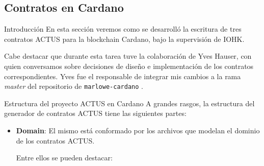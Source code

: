 \documentclass{beamer}
\begin{document}
\subsection{Contratos en Cardano}

\begin{frame}{Introducción}
En esta sección veremos como se desarrolló la escritura de tres contratos ACTUS para la blockchain Cardano, bajo la supervisión de IOHK.\@

\vfill

Cabe destacar que durante esta tarea tuve la colaboración de Yves Hauser, con quien conversamos sobre decisiones de diseño e implementación de los contratos correspondientes. Yves fue el responsable de integrar mis cambios a la rama \textit{master} del repositorio de \texttt{marlowe-cardano} \cite{marlowe-cardano-github}. %


\end{frame}

\begin{frame}[fragile]{Estructura del proyecto ACTUS en Cardano}
A grandes rasgos, la estructura del generador de contratos ACTUS tiene las siguientes partes:
    \vfill
    
\begin{itemize}
    \item  \textbf{Domain}: El mismo está conformado por los archivos que modelan el dominio de los contratos ACTUS.
        \medskip

        \pause Entre ellos se pueden destacar:

        

\end{itemize}
\end{frame}
\end{document}
